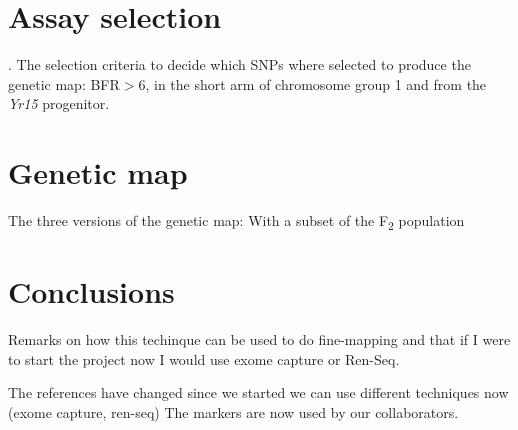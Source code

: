 \section{Assay selection}. 
The selection criteria to decide which SNPs where selected to produce the genetic map: BFR$>$6, in the short arm of chromosome group 1 and from the \textit{Yr15} progenitor.

\section{Genetic map} 
\label{yr15:geneticMap}
The three versions of the genetic map: With a subset of the F\textsubscript{2} population


\section{Conclusions} 
Remarks on how this techinque can be used to do fine-mapping and that if I were to start the project now I would  use exome capture or Ren-Seq. 

The references have changed since we started
we can use different techniques now (exome capture, ren-seq)
The markers are now used by our collaborators. 